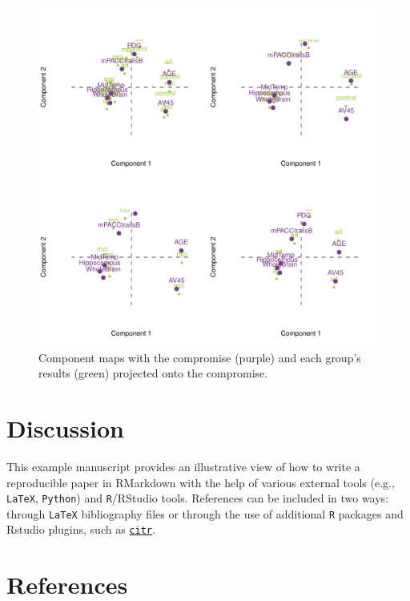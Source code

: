 \documentclass[man,floatsintext]{apa6}
\theoremstyle{definition}
\theoremstyle{definition}
\theoremstyle{definition}
\theoremstyle{remark}
\begin{document}
\begin{figure}[H]

{\centering \includegraphics{2_RMarkdown_APA_Manuscript_files/figure-latex/unnamed-chunk-1-1} 

}

\caption{Component maps with the compromise (purple) and each group's results (green) projected onto the compromise.}\label{fig:unnamed-chunk-1}
\end{figure}

\hypertarget{discussion}{%
\section{Discussion}\label{discussion}}

This example manuscript provides an illustrative view of how to write a
reproducible paper in RMarkdown with the help of various external tools
(e.g., \texttt{LaTeX}, \texttt{Python}) and \texttt{R}/RStudio tools.
References can be included in two ways: through \texttt{LaTeX}
bibliography files or through the use of additional \texttt{R} packages
and Rstudio plugins, such as
\href{https://github.com/crsh/citr}{\texttt{citr}}.

\newpage

\hypertarget{references}{%
\section{References}\label{references}}
\end{document}
